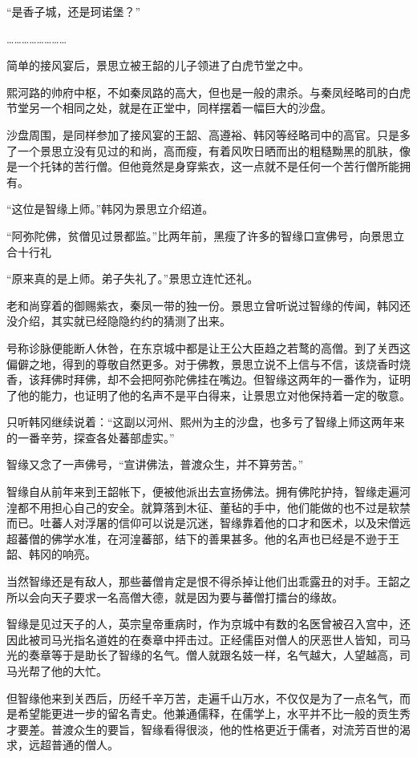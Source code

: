 “是香子城，还是珂诺堡？”

……………………

简单的接风宴后，景思立被王韶的儿子领进了白虎节堂之中。

熙河路的帅府中枢，不如秦凤路的高大，但也是一般的肃杀。与秦凤经略司的白虎节堂另一个相同之处，就是在正堂中，同样摆着一幅巨大的沙盘。

沙盘周围，是同样参加了接风宴的王韶、高遵裕、韩冈等经略司中的高官。只是多了一个景思立没有见过的和尚，高而瘦，有着风吹日晒而出的粗糙黝黑的肌肤，像是一个托钵的苦行僧。但他竟然是身穿紫衣，这一点就不是任何一个苦行僧所能拥有。

“这位是智缘上师。”韩冈为景思立介绍道。

“阿弥陀佛，贫僧见过景都监。”比两年前，黑瘦了许多的智缘口宣佛号，向景思立合十行礼

“原来真的是上师。弟子失礼了。”景思立连忙还礼。

老和尚穿着的御赐紫衣，秦凤一带的独一份。景思立曾听说过智缘的传闻，韩冈还没介绍，其实就已经隐隐约约的猜测了出来。

号称诊脉便能断人休咎，在东京城中都是让王公大臣趋之若鹜的高僧。到了关西这偏僻之地，得到的尊敬自然更多。对于佛教，景思立说不上信与不信，该烧香时烧香，该拜佛时拜佛，却不会把阿弥陀佛挂在嘴边。但智缘这两年的一番作为，证明了他的能力，也证明了他的名声不是平白得来，让景思立对他保持着一定的敬意。

只听韩冈继续说着：“这副以河州、熙州为主的沙盘，也多亏了智缘上师这两年来的一番辛劳，探查各处蕃部虚实。”

智缘又念了一声佛号，“宣讲佛法，普渡众生，并不算劳苦。”

智缘自从前年来到王韶帐下，便被他派出去宣扬佛法。拥有佛陀护持，智缘走遍河湟都不用担心自己的安全。就算落到木征、董毡的手中，他们能做的也不过是软禁而已。吐蕃人对浮屠的信仰可以说是沉迷，智缘靠着他的口才和医术，以及宋僧远超蕃僧的佛学水准，在河湟蕃部，结下的善果甚多。他的名声也已经是不逊于王韶、韩冈的响亮。

当然智缘还是有敌人，那些蕃僧肯定是恨不得杀掉让他们出乖露丑的对手。王韶之所以会向天子要求一名高僧大德，就是因为要与蕃僧打擂台的缘故。

智缘是见过天子的人，英宗皇帝重病时，作为京城中有数的名医曾被召入宫中，还因此被司马光指名道姓的在奏章中抨击过。正经儒臣对僧人的厌恶世人皆知，司马光的奏章等于是助长了智缘的名气。僧人就跟名妓一样，名气越大，人望越高，司马光帮了他的大忙。

但智缘他来到关西后，历经千辛万苦，走遍千山万水，不仅仅是为了一点名气，而是希望能更进一步的留名青史。他兼通儒释，在儒学上，水平并不比一般的贡生秀才要差。普渡众生的要旨，智缘看得很淡，他的性格更近于儒者，对流芳百世的渴求，远超普通的僧人。

